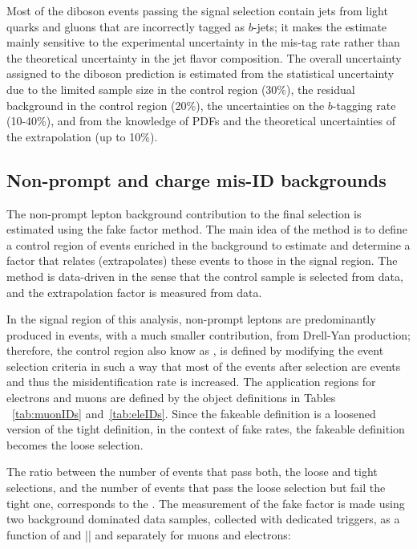 Most of the diboson events passing the signal selection contain jets from light quarks and gluons that are incorrectly tagged as $b$-jets; it makes the estimate mainly sensitive to the experimental uncertainty in the mis-tag rate rather than the theoretical uncertainty in the jet flavor composition. The overall uncertainty assigned to the diboson prediction is estimated from the statistical uncertainty due to the limited sample size in the control region (30\%), the residual background in the control region (20\%), the uncertainties on the $b$-tagging rate (10-40\%), and from the knowledge of PDFs and the theoretical uncertainties of the extrapolation (up to 10\%).

\subsection{Non-prompt and charge mis-ID backgrounds}\label{ssec:fake_rate}

The non-prompt lepton background contribution to the final selection is estimated using the fake factor method. The main idea of the method is to define a control region of events enriched in the background to estimate and determine a factor that relates (extrapolates) these events to those in the signal region. The method is data-driven in the sense that the control sample is selected from data, and the extrapolation factor is measured from data.

In the signal region of this analysis, non-prompt leptons are predominantly produced in \ttbar events, with a much smaller contribution, from Drell-Yan production; therefore, the control region also know as , is defined by modifying the event selection criteria in such a way that most of the events after selection are \ttbar events and thus the misidentification rate is increased. The application regions for electrons and muons are defined by the  object definitions in Tables ~\ref{tab:muonIDs} and~\ref{tab:eleIDs}. Since the fakeable definition is a loosened version of the tight definition, in the context of fake rates, the fakeable definition becomes the loose selection. 

The ratio between the number of events that pass both, the loose and tight selections, and the number of events that pass the loose selection but fail the tight one, corresponds to the . The measurement of the fake factor is made using two background dominated data samples, collected with dedicated triggers, %
as a function of \pt and |\etac| and separately for muons and electrons:

